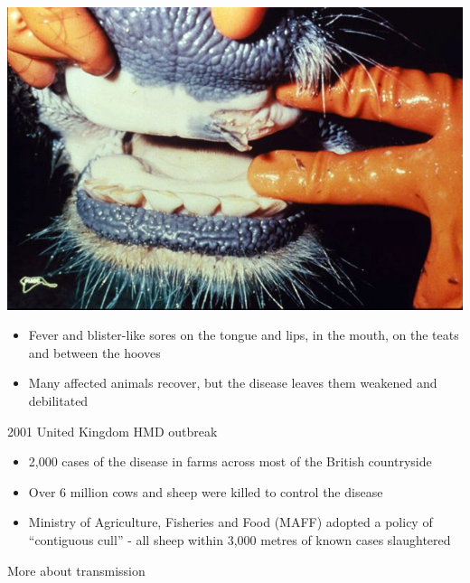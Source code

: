 \documentclass[aspectratio=43]{beamer}
\begin{document}
\begin{frame}{}
  \begin{minipage}{0.3\textwidth}
    \includegraphics[width=1.1\textwidth]{../FIGS/Foot_and_mouth_disease_in_mouth.jpg}
  \end{minipage}
  \begin{minipage}{0.65\textwidth}
    \begin{itemize}
      \item Fever and blister-like sores on the tongue and lips, in the mouth, on the teats and between the hooves
      \item Many affected animals recover, but the disease leaves them weakened and debilitated
    \end{itemize}
  \end{minipage}
\end{frame}


\begin{frame}{2001 United Kingdom HMD outbreak}
  \begin{itemize}
    \item 2,000 cases of the disease in farms across most of the British countryside
    \vfill
    \item Over 6 million cows and sheep were killed to control the disease
    \vfill
    \item Ministry of Agriculture, Fisheries and Food (MAFF) adopted a policy of ``contiguous cull'' - all sheep within 3,000 metres of known cases slaughtered
  \end{itemize}
\end{frame}

\begin{frame}{More about transmission}

\end{frame}
\end{document}
